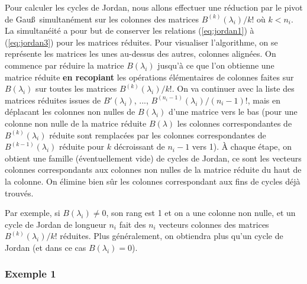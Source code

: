 \documentclass[a4paper,11pt]{article}
\begin{document}
Pour calculer les cycles de Jordan, nous allons effectuer une
r\'eduction par le pivot de Gau\ss\ simultan\'ement sur les colonnes
des matrices $B^{(k)}(\lambda _i)/k!$ o\`u $k<n_i$. 
La simultan\'eit\'e a pour but de conserver les
relations (\ref{eq:jordan1}) \`a (\ref{eq:jordan3}) pour les matrices
r\'eduites. Pour visualiser l'algorithme, on se repr\'esente les
matrices les unes au-dessus des autres, colonnes align\'ees.
On commence par r\'eduire la matrice $B(\lambda _i)$ jusqu'\`a ce
que l'on obtienne une matrice r\'eduite {\bf en recopiant} les op\'erations
\'el\'ementaires de colonnes faites sur $B(\lambda _i)$ sur toutes les matrices
$B^{(k)}(\lambda _i)/k!$. On va continuer avec la liste des matrices
r\'eduites issues de $B'(\lambda _i)$, ..., 
$B^{(n_i-1)}(\lambda _i)/(n_i-1)!$, 
mais en d\'eplacant les colonnes non nulles de $B(\lambda _i)$ 
d'une matrice vers le bas
(pour une colonne non nulle de la matrice r\'eduite $B(\lambda )$
les colonnes correspondantes de $B^{(k)}(\lambda _i)$ r\'eduite 
sont remplac\'ees par les colonnes correspondantes de $B^{(k-1)}(\lambda _i)$
r\'eduite pour $k$ d\'ecroissant de $n_i-1$ vers 1).
\`A chaque \'etape, on obtient une famille (\'eventuellement vide)
de cycles de Jordan, ce sont les vecteurs colonnes correspondants 
aux colonnes non nulles de la matrice r\'eduite du haut de la colonne.
On \'elimine bien s\^ur les colonnes correspondant aux fins de cycles
d\'ej\`a trouv\'es.

Par exemple, si $B(\lambda _i)\neq 0$, son rang est 1 et on a
une colonne non nulle, et un cycle de Jordan de longueur
$n_i$ fait des $n_i$ vecteurs colonnes des matrices
$B^{(k)}(\lambda _i)/k!$ r\'eduites. 
Plus g\'en\'eralement, on obtiendra plus qu'un cycle de Jordan
(et dans ce cas $B(\lambda _i)= 0$).


\subsubsection{Exemple 1} \label{sec:ex1}
\end{document}
